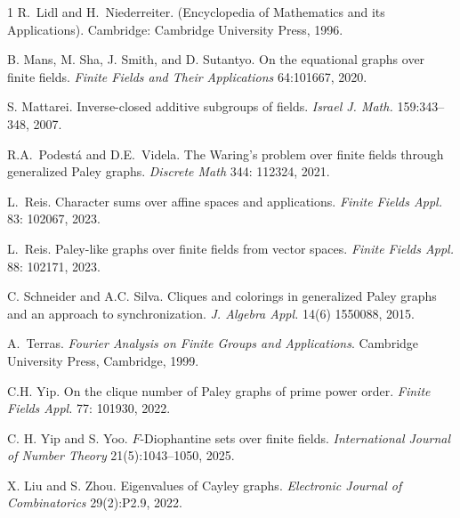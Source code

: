 \documentclass[11pt]{amsart}
\theoremstyle{definition}
\theoremstyle{remark}
\begin{document}
\begin{thebibliography}{1}
 R.~Lidl and H.~Niederreiter.
 (Encyclopedia of Mathematics and its Applications). 
\newblock Cambridge: Cambridge University Press, 1996.



 B. Mans, M. Sha, J. Smith, and D. Sutantyo. On the equational graphs over finite fields. {\em Finite Fields and Their Applications} 64:101667, 2020.

 S. Mattarei. Inverse-closed additive subgroups of fields. {\em Israel J. Math.} 159:343--348, 2007.

 R.A.~Podestá and D.E.~Videla. The Waring's problem over finite fields through generalized Paley graphs. {\em Discrete Math} 344: 112324, 2021.

 L.~Reis. Character sums over affine spaces and applications. {\em Finite Fields Appl.} 83: 102067, 2023.

 L.~Reis. Paley-like graphs over finite fields from vector spaces. {\em Finite Fields Appl.} 88: 102171, 2023.


  C. Schneider and A.C. Silva. Cliques and colorings in generalized Paley graphs and
an approach to synchronization. {\em J. Algebra Appl.} 14(6) 1550088, 2015.

 A.~Terras. {\em Fourier Analysis on Finite Groups and Applications}. Cambridge University Press, Cambridge, 1999.



 C.H. Yip. On the clique number of Paley graphs of prime power order. {\em Finite Fields
Appl.} 77: 101930, 2022.

 C. H. Yip and S. Yoo. $F$-Diophantine sets over finite fields. {\em International Journal of Number Theory} 21(5):1043--1050, 2025.

 X. Liu and S. Zhou. Eigenvalues of Cayley graphs. {\em Electronic Journal of Combinatorics} 29(2):P2.9, 2022.

    
\end{thebibliography}
\end{document}
